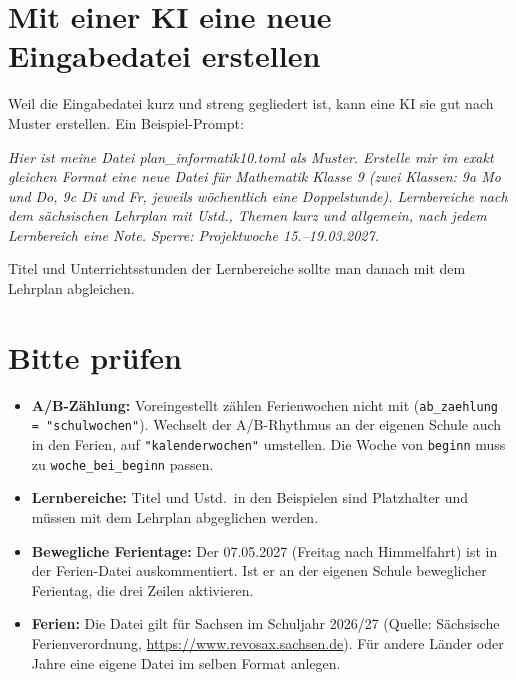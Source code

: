 \section{Mit einer KI eine neue Eingabedatei erstellen}

Weil die Eingabedatei kurz und streng gegliedert ist, kann eine KI sie gut nach Muster erstellen. Ein Beispiel-Prompt:

\begin{hinweis}
	\itshape Hier ist meine Datei plan\_informatik10.toml als Muster. Erstelle mir im exakt gleichen Format eine neue Datei für Mathematik Klasse 9 (zwei Klassen: 9a Mo und Do, 9c Di und Fr, jeweils wöchentlich eine Doppelstunde). Lernbereiche nach dem sächsischen Lehrplan mit Ustd., Themen kurz und allgemein, nach jedem Lernbereich eine Note. Sperre: Projektwoche 15.--19.03.2027.
\end{hinweis}

Titel und Unterrichtsstunden der Lernbereiche sollte man danach mit dem Lehrplan abgleichen.



\section{Bitte prüfen}

\begin{itemize}
	\item \textbf{A/B-Zählung:} Voreingestellt zählen Ferienwochen nicht mit (\texttt{ab\_zaehlung = "schulwochen"}). Wechselt der A/B-Rhythmus an der eigenen Schule auch in den Ferien, auf \texttt{"kalenderwochen"} umstellen. Die Woche von \texttt{beginn} muss zu \texttt{woche\_bei\_beginn} passen.
	\item \textbf{Lernbereiche:} Titel und Ustd.\ in den Beispielen sind Platzhalter und müssen mit dem Lehrplan abgeglichen werden.
	\item \textbf{Bewegliche Ferientage:} Der 07.05.2027 (Freitag nach Himmelfahrt) ist in der Ferien-Datei auskommentiert. Ist er an der eigenen Schule beweglicher Ferientag, die drei Zeilen aktivieren.
	\item \textbf{Ferien:} Die Datei gilt für Sachsen im Schuljahr 2026/27 (Quelle: Sächsische Ferienverordnung, \url{https://www.revosax.sachsen.de}). Für andere Länder oder Jahre eine eigene Datei im selben Format anlegen.
\end{itemize}



